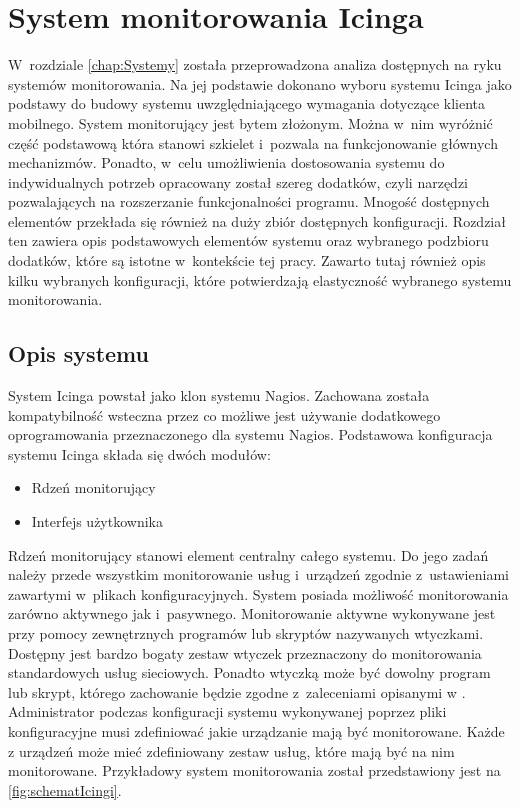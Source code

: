 \chapter{System monitorowania Icinga}
\label{chap:Icinga}

W~rozdziale \ref{chap:Systemy} została przeprowadzona analiza
dostępnych na ryku systemów monitorowania. Na jej podstawie dokonano
wyboru systemu Icinga jako podstawy do budowy systemu uwzględniającego
wymagania dotyczące klienta mobilnego. System monitorujący jest bytem
złożonym. Można w~nim wyróżnić część podstawową która stanowi szkielet
i~pozwala na funkcjonowanie głównych mechanizmów. Ponadto, w~celu
umożliwienia dostosowania systemu do indywidualnych potrzeb opracowany
został szereg dodatków, czyli narzędzi pozwalających na rozszerzanie
funkcjonalności programu. Mnogość dostępnych elementów przekłada się
również na duży zbiór dostępnych konfiguracji. Rozdział ten zawiera
opis podstawowych elementów systemu oraz wybranego podzbioru dodatków,
które są istotne w~kontekście tej pracy. Zawarto tutaj również opis
kilku wybranych konfiguracji, które potwierdzają elastyczność
wybranego systemu monitorowania.

\section[Opis systemu][Opis systemu]{Opis systemu}

System Icinga powstał jako klon systemu Nagios. Zachowana została
kompatybilność wsteczna przez co możliwe jest używanie dodatkowego
oprogramowania przeznaczonego dla systemu Nagios. Podstawowa
konfiguracja systemu Icinga składa się dwóch modułów:

\begin{itemize}
\item Rdzeń monitorujący
\item Interfejs użytkownika
\end{itemize}

Rdzeń monitorujący stanowi element centralny całego systemu. Do jego
zadań należy przede wszystkim monitorowanie usług i~urządzeń zgodnie
z~ustawieniami zawartymi w~plikach konfiguracyjnych. System posiada
możliwość monitorowania zarówno aktywnego jak
i~pasywnego. Monitorowanie aktywne wykonywane jest przy pomocy
zewnętrznych programów lub skryptów nazywanych wtyczkami. Dostępny
jest bardzo bogaty zestaw wtyczek przeznaczony do monitorowania
standardowych usług sieciowych. Ponadto wtyczką może być dowolny
program lub skrypt, którego zachowanie będzie zgodne z~zaleceniami
opisanymi w \cite{www:NagiosPluginsTutorial}. Administrator podczas
konfiguracji systemu wykonywanej poprzez pliki konfiguracyjne musi
zdefiniować jakie urządzanie mają być monitorowane. Każde z urządzeń
może mieć zdefiniowany zestaw usług, które mają być na nim
monitorowane. Przykładowy system monitorowania został przedstawiony
jest na \ref{fig:schematIcingi}.


